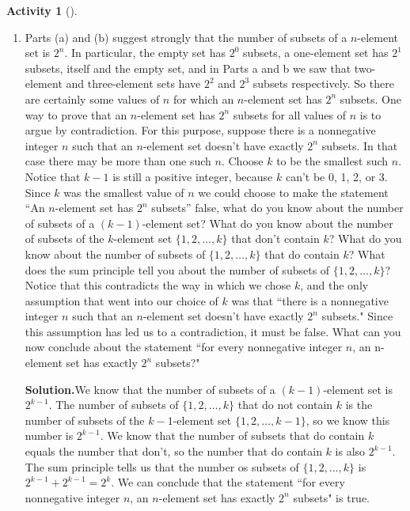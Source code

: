 \documentclass[10pt,]{book}
\theoremstyle{plain}
\theoremstyle{definition}
\newtheorem{activity}[project]{Activity}
\numberwithin{equation}{chapter}
\begin{document}
\begin{activity}[]
\begin{enumerate}[label=(\alph*)]
~\par
\item Parts (a) and (b) suggest strongly that the number of subsets of a \(n\)-element set is \(2^n\). In particular, the empty set has \(2^0\) subsets, a one-element set has \(2^1\) subsets, itself and the empty set, and in Parts a and b we saw that two-element and three-element sets have \(2^2\) and \(2^3\) subsets respectively. So there are certainly some values of \(n\) for which an \(n\)-element set has \(2^n\) subsets. One way to prove that an \(n\)-element set has \(2^n\) subsets for all values of \(n\) is to argue by contradiction. For this purpose, suppose there is a nonnegative integer \(n\) such that an \(n\)-element set doesn't have exactly \(2^n\) subsets. In that case there may be more than one such \(n\). Choose \(k\) to be the smallest such \(n\). Notice that \(k -1\) is still a positive integer, because \(k\) can't be 0, 1, 2, or 3. Since \(k\) was the smallest value of \(n\) we could choose to make the statement ``An \(n\)-element set has \(2^n\) subsets'' false, what do you know about the number of subsets of a \((k - 1)\)-element set? What do you know about the number of subsets of the \(k\)-element set \(\{1, 2, \ldots, k \}\) that don't contain \(k\)? What do you know about the number of subsets of \(\{1,
2, \ldots,  k \}\) that do contain \(k\)? What does the sum principle tell you about the number of subsets of \(\{1, 2, \ldots, k \}\)? Notice that this contradicts the way in which we chose \(k\), and the only assumption that went into our choice of \(k\) was that ``there is a nonnegative integer \(n\) such that an \(n\)-element set doesn't have exactly \(2^n\) subsets." Since this assumption has led us to a contradiction, it must be false. What can you now conclude about the statement ``for every nonnegative integer \(n\), an n-element set has exactly \(2^n\) subsets?"%
\par\medskip\noindent%
\textbf{Solution.}\quad We know that the number of subsets of a \((k-1)\)-element set is \(2^{k-1}\). The number of subsets of \(\{1,2,\ldots,k\}\) that do not contain \(k\) is the number of subsets of the \(k-1\)-element set \(\{1,2,\ldots,
k-1\}\), so we know this number is \(2^{k-1}\). We know that the number of subsets that do contain \(k\) equals the number that don't, so the number that do contain \(k\) is also \(2^{k-1}\). The sum principle tells us that the number os subsets of \(\{1,2,\ldots, k\}\) is \(2^{k-1}+2^{k-1}=2^k\). We can conclude that the statement ``for every nonnegative integer \(n\), an \(n\)-element set has exactly \(2^n\) subsets" is true.%

\end{enumerate}
\end{activity}
\end{document}
